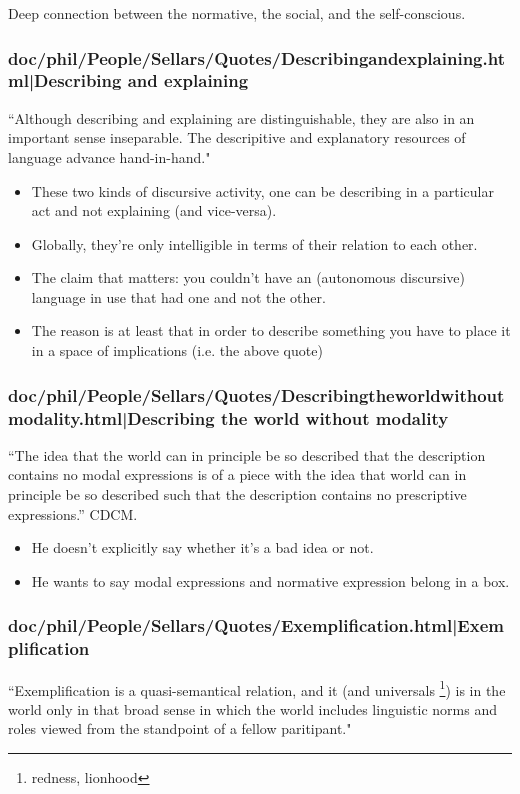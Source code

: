 \documentclass[12pt,a4paper]{report}
\begin{document}
Deep connection between the normative, the social, and the self-conscious.
\subsubsection{doc/phil/People/Sellars/Quotes/Describingandexplaining.html|Describing and explaining}
``Although describing and explaining are distinguishable, they are also in an
important sense inseparable. The descripitive and explanatory resources of
language advance hand-in-hand."

\begin{itemize}
    \item  These two kinds of discursive activity, one can be describing in a
           particular act and not explaining (and vice-versa).
    \item Globally, they're only intelligible in terms of their relation to
          each other.
    \item The claim that matters: you couldn't have an  (autonomous discursive)
          language in use that had one and not the other.
    \item The reason is at least that in order to describe something you have
          to place it in a space of implications (i.e. the above quote)
\end{itemize}
\subsubsection{doc/phil/People/Sellars/Quotes/Describingtheworldwithoutmodality.html|Describing the world without modality}
``The idea that the world can in principle be so described that the description
contains no modal expressions is of a piece with the idea that world can in
principle be so described such that the description contains no prescriptive
expressions.'' CDCM.

\begin{itemize}
    \item He doesn't explicitly say whether it's a bad idea or not.
    \item He wants to say modal expressions and normative expression belong in
          a box.
\end{itemize}
\subsubsection{doc/phil/People/Sellars/Quotes/Exemplification.html|Exemplification}
``Exemplification is a quasi-semantical relation, and it (and universals
\footnote{redness, lionhood}) is in the world only in that broad sense in which the
world includes linguistic norms and roles viewed from the standpoint of a
fellow paritipant."
\end{document}
